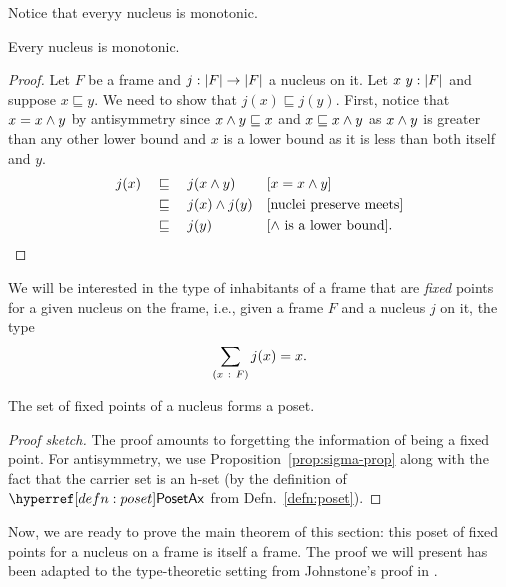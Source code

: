 Notice that everyy nucleus is monotonic.
\begin{prop}\label{prop:nucleus-mono}
  Every nucleus is monotonic.
\end{prop}
\begin{proof}
  Let $F$ be a frame and $j : \left| F \right| \rightarrow \left| F \right|$ a nucleus on it. Let
  $x~y:\left| F \right|$ and suppose $x \sqsubseteq y$. We need to show that $j(x) \sqsubseteq j(y)$. First,
  notice that $x = x \wedge y$ by antisymmetry since $x \wedge y \sqsubseteq x$ and $x \sqsubseteq
  x \wedge y$ as $x \wedge y$ is greater than any other lower bound and $x$ is a lower
  bound as it is less than both itself and $y$.
  \begin{align*}
    j(x) &\quad\sqsubseteq\quad j(x \wedge y)                 && [x = x \wedge y]                      \\
         &\quad\sqsubseteq\quad j(x) \wedge j(y)              && [\text{nuclei preserve meets}]         \\
         &\quad\sqsubseteq\quad {j(y)}                         && [\text{$\wedge$ is a lower bound}]  .
  \end{align*}
\end{proof}

We will be interested in the type of inhabitants of a frame that are \emph{fixed} points
for a given nucleus on the frame, i.e., given a frame $F$ and a nucleus $j$ on it,
the type $$\sum_{(x~:~F)} j(x) = x.$$

\begin{prop}
  The set of fixed points of a nucleus forms a poset.
\end{prop}
\begin{proof}[Proof sketch]
  The proof amounts to forgetting the information of being a fixed point. For
  antisymmetry, we use Proposition~\ref{prop:sigma-prop} along with the fact that the
  carrier set is an h-set (by the definition of $\posetaxnm{}$ from
  Defn.~\ref{defn:poset}).
\end{proof}

Now, we are ready to prove the main theorem of this section: this poset of fixed points
for a nucleus on a frame is itself a frame. The proof we will present has been adapted to
the type-theoretic setting from Johnstone's proof in \cite[II.2.2, pg.~49]{stone-spaces}.

